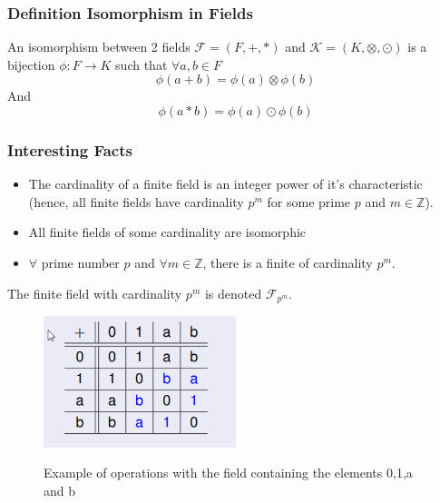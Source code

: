 \documentclass{article}
\begin{document}
\subsubsection{Definition Isomorphism in Fields} 
\begin{tcolorbox}[sharp corners, colback=green!30, colframe=green!80!blue, title=Isomorphism with fields]
An isomorphism between 2 fields $ \mathcal{F} = (F, +, *) $ and $ \mathcal{K} = (K, \otimes, \odot) $ is a bijection $ \phi: F \rightarrow K $ such that $ \forall a, b \in F $ 
\begin{equation}
\phi(a + b) = \phi(a) \otimes \phi(b)
\end{equation}
And
\begin{equation}
\phi(a * b) = \phi(a) \odot \phi(b)
\end{equation}
\end{tcolorbox}

\subsubsection{Interesting Facts}
\begin{itemize}
\item The cardinality of a finite field is an integer power of it's characteristic (hence, all finite fields have cardinality $ p^m $ for some prime $ p $ and $ m \in \mathbb{Z} $).
\item All finite fields of some cardinality are isomorphic
\item $ \forall $ prime number $ p $ and $ \forall m \in \mathbb{Z} $, there is a finite of cardinality $ p^m $.
\end{itemize}
The finite field with cardinality $ p^m $ is denoted $ \mathcal{F}_{p^m} $.

\begin{figure}[h]
  \hfill\includegraphics[width=0.5\textwidth]{field4.png}\hspace*{\fill}
  \label{fig:field4}
  
  \caption{Example of operations with the field containing the elements 0,1,a and b}
\end{figure}
\end{document}
